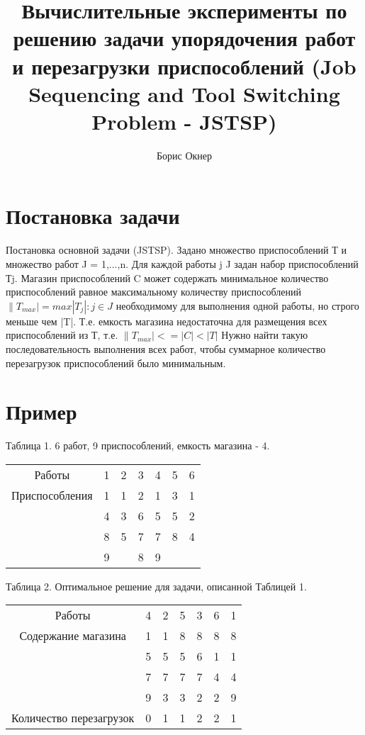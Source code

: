 \documentclass[a4paper]{article}
\title{Вычислительные эксперименты по решению задачи упорядочения работ и перезагрузки приспособлений (Job Sequencing and Tool Switching Problem - JSTSP)}
\author{Борис Окнер}
\begin{document}
\maketitle

\begin{abstract}

\end{abstract}

\section{Постановка задачи}

Постановка основной задачи (JSTSP). Задано множество приспособлений Т и множество работ J = {1,...,n}. Для каждой работы j  J задан набор приспособлений Тj. Магазин приспособлений C может содержать минимальное количество приспособлений равное максимальному количеству приспособлений 
$
\|T_{max}|  = max{|T_j| : j \in J} 
$
необходимому для выполнения одной работы, но строго меньше чем |T|. Т.е. емкость магазина недостаточна для размещения всех приспособлений из Т,  т.е. 
$
\|T_{max}| <= |C| < |T|
$
Нужно найти такую последовательность выполнения всех работ, чтобы суммарное количество перезагрузок приспособлений было минимальным.

\section{Пример}
Таблица 1. 6 работ, 9 приспособлений, емкость магазина - 4.

\begin{tabular}{ c c c c c c c}
 Работы & 1 & 2 & 3 & 4 & 5 & 6 \\ 
 Приспособления & 1 & 1 & 2 & 1 & 3 & 1 \\  
  & 4 & 3 & 6 & 5 & 5 & 2 \\
  & 8 & 5 & 7 & 7 & 8 & 4 \\
  & 9 &  & 8 & 9 &  &  \\
\end{tabular}

Таблица 2. Оптимальное решение для задачи, описанной Таблицей 1.

\begin{tabular}{ c c c c c c c}
 Работы & 4 & 2 & 5 & 3 & 6 & 1 \\ 
 Содержание магазина & 1 & 1 & 8 & 8 & 8 & 8 \\ 
  & 5 & 5 & 5 & 6 & 1 & 1 \\
  & 7 & 7 & 7 & 7 & 4 & 4 \\
  & 9 & 3 & 3 & 2 & 2 & 9 \\
 Количество перезагрузок & 0 & 1 & 1 & 2 & 2 & 1 \\ 
\end{tabular}
\end{document}
